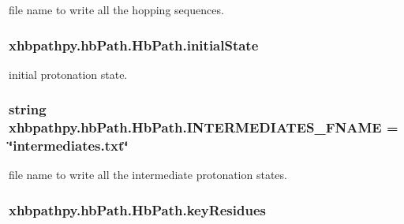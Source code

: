 file name to write all the hopping sequences. 

\hypertarget{classxhbpathpy_1_1hb_path_1_1_hb_path_a702f32f452e98cca922244b5d003861a}{
\subsubsection[{initial\-State}]{\setlength{\rightskip}{0pt plus 5cm}xhbpathpy.\-hb\-Path.\-Hb\-Path.\-initial\-State}}\label{classxhbpathpy_1_1hb_path_1_1_hb_path_a702f32f452e98cca922244b5d003861a}


initial protonation state. 

\hypertarget{classxhbpathpy_1_1hb_path_1_1_hb_path_a8749ebe7a54023db9c707cb93f3dbdad}{
\subsubsection[{I\-N\-T\-E\-R\-M\-E\-D\-I\-A\-T\-E\-S\-\_\-\-F\-N\-A\-M\-E}]{\setlength{\rightskip}{0pt plus 5cm}string xhbpathpy.\-hb\-Path.\-Hb\-Path.\-I\-N\-T\-E\-R\-M\-E\-D\-I\-A\-T\-E\-S\-\_\-\-F\-N\-A\-M\-E = \char`\"{}intermediates.\-txt\char`\"{}\hspace{0.3cm}{\ttfamily [static]}}}\label{classxhbpathpy_1_1hb_path_1_1_hb_path_a8749ebe7a54023db9c707cb93f3dbdad}


file name to write all the intermediate protonation states. 

\hypertarget{classxhbpathpy_1_1hb_path_1_1_hb_path_aafe90d4a4166ba875aab2cee3012cd69}{
\subsubsection[{key\-Residues}]{\setlength{\rightskip}{0pt plus 5cm}xhbpathpy.\-hb\-Path.\-Hb\-Path.\-key\-Residues}}\label{classxhbpathpy_1_1hb_path_1_1_hb_path_aafe90d4a4166ba875aab2cee3012cd69}


